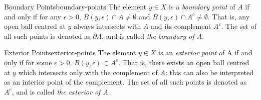 \documentclass{article}
\numberwithin{equation}{section}
\numberwithin{figure}{section}
\begin{document}
\begin{definition}{Boundary Points}{boundary-points}
    The element $ y \in X $ is a \emph{boundary point} of $ A $ if and only if
    for any $ \epsilon > 0 $, $ B(y, \epsilon) \cap A \neq \emptyset $ and
    $ B(y, \epsilon) \cap A^c \neq \emptyset $. That is, any open ball centred
    at $ y $ always intersects with $ A $ and its complement $ A^c $. The set of
    all such points is denoted as $ \partial A $, and is called \emph{the
    boundary of $ A $}.
\end{definition}
\begin{definition}{Exterior Points}{exterior-points}
    The element $ y \in X $ is an \emph{exterior point} of A if and only if for
    some $ \epsilon > 0 $, $ B(y, \epsilon) \subset A^c $. That is, there exists
    an open ball centred at $ y $ which intersects only with the complement of
    $ A $; this can also be interpreted as an interior point of the complement.
    The set of all such points is denoted as $ A^e $, and is called \emph{the
    exterior of A}.
\end{definition}
\end{document}
